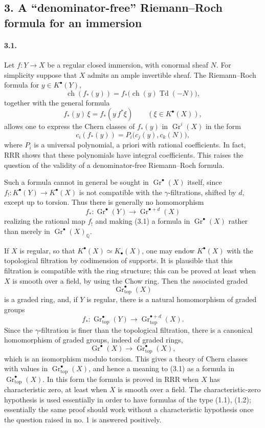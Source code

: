 \documentclass[12pt]{article}
\newcommand{\QQ}{\mathbb Q}
\newcommand{\Gr}{\operatorname{Gr}}
\newcommand{\Td}{\operatorname{Td}}
\newcommand{\ch}{\operatorname{ch}}
\newcommand{\longto}{\longrightarrow}
\newcommand{\topf}{\mathrm{top}}
\begin{document}
\subsection*{3. A ``denominator-free'' Riemann--Roch formula for an immersion}

\paragraph{3.1.}
Let $f:Y\to X$ be a regular closed immersion, with conormal sheaf $N$. For simplicity suppose that $X$ admits an ample invertible sheaf. The Riemann--Roch formula for $y\in K^\bullet(Y)$,
\[
\ch(f_*(y))=f_*\bigl(\ch(y)\Td(-N)\bigr),
\]
together with the general formula
\[
f_*(y)\,\xi=f_*(y\,f^*\xi)\qquad(\xi\in K^\bullet(X)),
\]
allows one to express the Chern classes of $f_*(y)$ in $\Gr^i(X)$ in the form
\[
c_i(f_*(y))=P_i\bigl(c_j(y),c_k(N)\bigr),
\tag{3.1}
\]
where $P_i$ is a universal polynomial, a priori with rational coefficients. In fact, RRR shows that these polynomials have integral coefficients. This raises the question of the validity of a denominator-free Riemann--Roch formula.

Such a formula cannot in general be sought in $\Gr^\bullet(X)$ itself, since $f_!:K^\bullet(Y)\to K^\bullet(X)$ is not compatible with the $\gamma$-filtrations, shifted by $d$, except up to torsion. Thus there is generally no homomorphism
\[
f_*:\Gr^\bullet(Y)\to\Gr^{\bullet+d}(X)
\]
realizing the rational map $f_!$ and making (3.1) a formula in $\Gr^\bullet(X)$ rather than merely in $\Gr^\bullet(X)_\QQ$.

If $X$ is regular, so that $K^\bullet(X)\simeq K_\bullet(X)$, one may endow $K^\bullet(X)$ with the topological filtration by codimension of supports. It is plausible that this filtration is compatible with the ring structure; this can be proved at least when $X$ is smooth over a field, by using the Chow ring. Then the associated graded
\[
\Gr^\bullet_{\topf}(X)
\]
is a graded ring, and, if $Y$ is regular, there is a natural homomorphism of graded groups
\[
f_*:\Gr^\bullet_{\topf}(Y)\longto \Gr^{\bullet+d}_{\topf}(X).
\]
Since the $\gamma$-filtration is finer than the topological filtration, there is a canonical homomorphism of graded groups, indeed of graded rings,
\[
\Gr^\bullet(X)\longto \Gr^\bullet_{\topf}(X),
\]
which is an isomorphism modulo torsion. This gives a theory of Chern classes with values in $\Gr^\bullet_{\topf}(X)$, and hence a meaning to (3.1) as a formula in $\Gr^\bullet_{\topf}(X)$. In this form the formula is proved in RRR when $X$ has characteristic zero, at least when $X$ is smooth over a field. The characteristic-zero hypothesis is used essentially in order to have formulas of the type (1.1), (1.2); essentially the same proof should work without a characteristic hypothesis once the question raised in no. 1 is answered positively.
\end{document}
